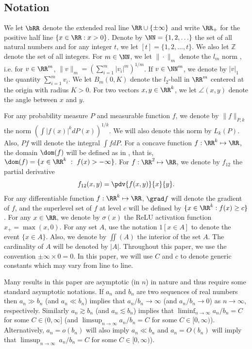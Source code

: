 \documentclass[preprint] {imsart}
\begin{document}
\subsection{Notation}
\label{sec: notation}
  We let $\bRR$ denote the extended real line $\RR\cup\{\pm \infty\}$ and write $\RR_+$ for the positive half line $\{x\in\RR:x>0\}$. Denote by $\NN=\{1,2,\ldots\}$ the set of all natural numbers and for any integer $t$, we let $[t]=\{1,2,...,t\}$. We also let $\mathbb Z$ denote the set of all integers. For $m\in\NN$, we let $\|\cdot\|_m$ denote the $l_m$ norm , i.e. for $v\in\RR^m$, $\|v\|_m=(\sum_{i=1}^m |v_i|^m)^{1/m}$.
  If $v\in\NN^m$, we denote by $|v|_1$ the quantity $\sum_{i=1}^mv_i$. We let $B_{m}(0,K)$ denote the $l_2$-ball in $\RR^{m}$ centered at the origin with radius $K>0$. For two vectors $x,y\in\RR^{k}$, we let $\angle(x,y)$ denote the angle between $x$ and $y$.
  
  
  For any  probability measure $P$ and measurable function $f$, we denote by  $\|f\|_{P,k}$ the norm $\left(\int|f(x)|^k dP(x)\right)^{1/k}$. We will  also denote this norm by $L_k(P)$. Also,  $Pf$ will denote the integral $\int f dP$. For a concave function $f:\RR^k\mapsto\RR$, the domain  $\dom(f)$ will be defined as in \citep[][p. 74]{hiriart2004}, that is, $\dom(f)=\{x\in\RR^k\ :\ f(x)>-\infty\}$. 
For $f:\RR^2\mapsto \RR$, we denote by $f_{12}$ the partial derivative
\[f_{12}(x,y)=\pdv{f(x,y)}{x}{y}.\]
For any differentiable function $f:\RR^k\mapsto\RR$, $\grad f$ will denote the gradient of $f$, and the superlevel set of $f$ at level $c$ will be defined by  $\{x\in\RR^k: f(x)\geq c\}$.
For any $x\in\RR$, we denote by $\sigma(x)$ the ReLU activation function $x_+=\max(x,0)$.
 For any set $A$, use the notation $1[x\in A]$ to denote the event $\{x\in A\}$. Also, we denote by $\iint(A)$ the interior of the set $A$. The cardinality of $A$ will be denoted by $|A|$. Throughout this paper, we use the convention $\pm\infty\times 0=0$.
  In this paper, we will use $C$ and $c$ to denote generic constants which may vary from line to line. 
 
  Many  results in this paper are  asymptotic (in $n$) in nature and thus require some standard asymptotic notations.  If $a_n$ and $b_n$ are two sequences of real numbers then $a_n \gg b_n$ (and $a_n \ll b_n$) implies that ${a_n}/{b_n} \rightarrow \infty$ (and ${a_n}/{b_n} \rightarrow 0$) as $n \rightarrow \infty$, respectively. Similarly $a_n \gtrsim b_n$ (and $a_n \lesssim b_n$) implies that $\liminf_{n \rightarrow \infty} {{a_n}/{b_n}} = C$ for some $C \in (0,\infty]$ (and $\limsup_{n \rightarrow \infty} {{a_n}/{b_n}} =C$ for some $C \in [0,\infty)$). Alternatively, $a_n = o(b_n)$ will also imply $a_n \ll b_n$ and $a_n=O(b_n)$ will imply that $\limsup_{n \rightarrow \infty} \ a_n / b_n = C$ for some $C \in [0,\infty)$).
\end{document}
